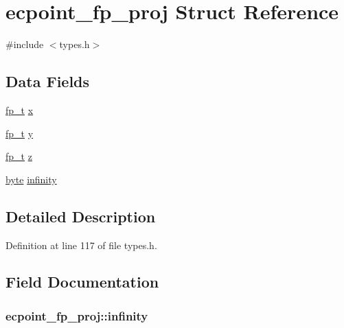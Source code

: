 \hypertarget{structecpoint__fp__proj}{\section{ecpoint\-\_\-fp\-\_\-proj Struct Reference}
\label{structecpoint__fp__proj}
}


{\ttfamily \#include $<$types.\-h$>$}

\subsection*{Data Fields}
\begin{DoxyCompactItemize}
\item 
\hyperlink{types_8h_a394d4948fdab003e7d47d78d73f8a64f}{fp\-\_\-t} \hyperlink{structecpoint__fp__proj_a2262d0cad1d0cd97349b8b07a2b1f46a}{x}
\item 
\hyperlink{types_8h_a394d4948fdab003e7d47d78d73f8a64f}{fp\-\_\-t} \hyperlink{structecpoint__fp__proj_a3c6f46c1e0cb729d836ba6356b26840e}{y}
\item 
\hyperlink{types_8h_a394d4948fdab003e7d47d78d73f8a64f}{fp\-\_\-t} \hyperlink{structecpoint__fp__proj_a0625d3b4fd1ae6fb61bdbf37c062feb0}{z}
\item 
\hyperlink{types_8h_a0c8186d9b9b7880309c27230bbb5e69d}{byte} \hyperlink{structecpoint__fp__proj_a3af6a288efcbfafb550e5b228c3ab192}{infinity}
\end{DoxyCompactItemize}


\subsection{Detailed Description}


Definition at line 117 of file types.\-h.



\subsection{Field Documentation}
\hypertarget{structecpoint__fp__proj_a3af6a288efcbfafb550e5b228c3ab192}{
\subsubsection[{infinity}]{ ecpoint\-\_\-fp\-\_\-proj\-::infinity}}\label{structecpoint__fp__proj_a3af6a288efcbfafb550e5b228c3ab192}


